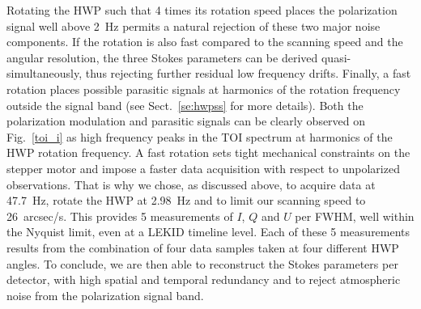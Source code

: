 \documentclass[twocolumn, traditabstract]{aa}
\begin{document}
Rotating the HWP such that 4 times its rotation speed places the polarization
signal well above 2~Hz  permits a natural rejection of these two major
noise components. If the rotation is also fast compared to the scanning speed
and the angular resolution, the three Stokes parameters can be derived
quasi-simultaneously, thus rejecting further residual low frequency
drifts. Finally, a fast rotation places possible parasitic signals at harmonics
of the rotation frequency outside the signal band (see Sect.~\ref{se:hwpss} for
more details). Both the polarization modulation and parasitic signals can be
clearly observed on Fig.~\ref{toi_i} as high frequency peaks in the TOI
spectrum at harmonics of the HWP rotation frequency. A fast rotation sets tight mechanical constraints on the stepper motor 
and impose a faster data acquisition with respect to unpolarized observations. That
is why we chose, as discussed above, to acquire data at 47.7~Hz, rotate
the HWP at 2.98~Hz and to limit our scanning speed to 26~arcsec/s. This
provides 5 measurements of $I$, $Q$ and $U$ per FWHM, well within the Nyquist limit,
even at a LEKID timeline level. Each of these 5 measurements results from the
  combination of four data samples taken at four different HWP angles. To
  conclude, we are then able to reconstruct the Stokes parameters per
  detector, with high spatial and temporal redundancy and to reject atmospheric
  noise from the polarization signal band.
\end{document}

